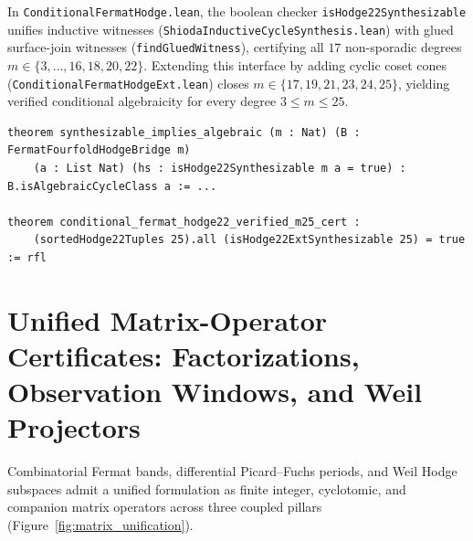 \documentclass[11pt,a4paper]{article}
\begin{document}
In \texttt{Conditional\allowbreak{}Fermat\allowbreak{}Hodge.lean}, the boolean checker \texttt{is\allowbreak{}Hodge22\allowbreak{}Syn\allowbreak{}thesizable} unifies inductive witnesses (\texttt{Shioda\allowbreak{}Inductive\allowbreak{}Cycle\allowbreak{}Syn\allowbreak{}thesis.lean}) with glued surface-join witnesses (\texttt{find\allowbreak{}Glued\allowbreak{}Witness}), certifying all $17$ non-sporadic degrees $m \in \{3,\dots,16,18,20,22\}$. Extending this interface by adding cyclic coset cones (\texttt{Conditional\allowbreak{}Fermat\allowbreak{}Hodge\allowbreak{}Ext.lean}) closes $m \in \{17,19,21,23,24,25\}$, yielding verified conditional algebraicity for every degree $3 \le m \le 25$.

\begin{lstlisting}[caption={Conditional soundness and extended $m \le 25$ verification in \texttt{ConditionalFermatHodge.lean} and \texttt{ConditionalFermatHodgeExt.lean}.}]
theorem synthesizable_implies_algebraic (m : Nat) (B : FermatFourfoldHodgeBridge m)
    (a : List Nat) (hs : isHodge22Synthesizable m a = true) : B.isAlgebraicCycleClass a := ...

theorem conditional_fermat_hodge22_verified_m25_cert :
    (sortedHodge22Tuples 25).all (isHodge22ExtSynthesizable 25) = true := rfl
\end{lstlisting}

\section{Unified Matrix-Operator Certificates: Factorizations, Observation Windows, and Weil Projectors}

Combinatorial Fermat bands, differential Picard--Fuchs periods, and Weil Hodge subspaces admit a unified formulation as finite integer, cyclotomic, and companion matrix operators across three coupled pillars (Figure~\ref{fig:matrix_unification}).
\end{document}
